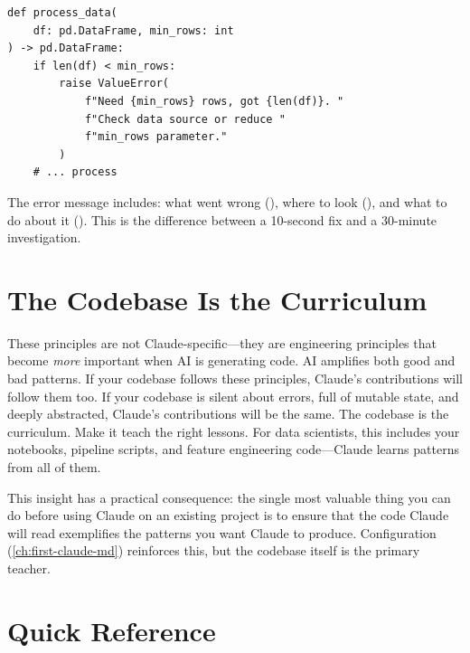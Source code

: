 \begin{verbatim}
def process_data(
    df: pd.DataFrame, min_rows: int
) -> pd.DataFrame:
    if len(df) < min_rows:
        raise ValueError(
            f"Need {min_rows} rows, got {len(df)}. "
            f"Check data source or reduce "
            f"min_rows parameter."
        )
    # ... process
\end{verbatim}


The error message includes: what went wrong (),
where to look (), and what to do about it
(). This is the difference between a
10-second fix and a 30-minute investigation.

\section{The Codebase Is the Curriculum}
\label{sec:codebase-curriculum}

\begin{keyinsight}
These principles are not Claude-specific---they are engineering principles
that become \emph{more} important when AI is generating code.
AI amplifies both good and bad patterns. If your codebase follows
these principles, Claude's contributions will follow them too.
If your codebase is silent about errors, full of mutable state,
and deeply abstracted, Claude's contributions will be the same.
The codebase is the curriculum. Make it teach the right lessons.
For data scientists, this includes your notebooks, pipeline scripts,
and feature engineering code---Claude learns patterns from all of them.
\end{keyinsight}

This insight has a practical consequence: the single most valuable
thing you can do before using Claude on an existing project is
to ensure that the code Claude will read exemplifies the patterns
you want Claude to produce. Configuration (\cref{ch:first-claude-md})
reinforces this, but the codebase itself is the primary teacher.


\section{Quick Reference}

